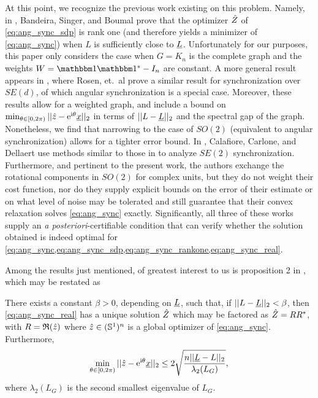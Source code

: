
At this point, we recognize the previous work existing on this problem.  Namely, in \cite{bandeira2016tightness}, Bandeira, Singer, and Boumal prove that the optimizer $\hat{Z}$ of \eqref{eq:ang_sync_sdp} is rank one (and therefore yields a minimizer of \eqref{eq:ang_sync}) when $L$ is sufficiently close to $\underline{L}$.  Unfortunately for our purposes, this paper only considers the case when $G = K_n$ is the complete graph and the weights $W = \one \one^* - I_n$ are constant.  A more general result appears in \cite{bandeira2016se_sync}, where Rosen, et.~al prove a similar result for synchronization over $SE(d)$, of which angular synchronization is a special case.  Moreover, these results allow for a weighted graph, and include a bound on $\min_{\theta \in [0, 2\pi)} ||\hat{z} - \mathrm{e}^{\mathrm{i}\theta} \underline{x}||_2$ in terms of $||L - \underline{L}||_2$ and the spectral gap of the graph.  Nonetheless, we find that narrowing to the case of $SO(2)$ (equivalent to angular synchronization) allows for a tighter error bound.  In \cite{calafiore2016complex_pgo}, Calafiore, Carlone, and Dellaert use methods similar to those in \cite{bandeira2016se_sync} to analyze $SE(2)$ synchronization.  Furthermore, and pertinent to the present work, the authors exchange the rotational components in $SO(2)$ for complex units, but they do not weight their cost function, nor do they supply explicit bounds on the error of their estimate or on what level of noise may be tolerated and still guarantee that their convex relaxation solves \eqref{eq:ang_sync} exactly.  Significantly, all three of these works supply an \emph{a posteriori}-certifiable condition that can verify whether the solution obtained is indeed optimal for \cref{eq:ang_sync,eq:ang_sync_sdp,eq:ang_sync_rankone,eq:ang_sync_real}.

Among the results just mentioned, of greatest interest to us is proposition 2 in \cite{bandeira2016se_sync}, which may be restated as

\begin{proposition}
  There exists a constant $\beta > 0$, depending on $\underline{L}$, such that, if $||L - \underline{L}||_2 < \beta$, then \eqref{eq:ang_sync_real} has a unique solution $\hat{Z}$ which may be factored as $\hat{Z} = R R^*$, with $R = \mathfrak{R}(\hat{z})$ where $\hat{z} \in (\mathbb{S}^1)^n$ is a global optimizer of \eqref{eq:ang_sync}.  Furthermore, \[\min_{\theta \in [0, 2\pi)} ||\hat{z} - \mathrm{e}^{\mathrm{i} \theta} \underline{x}||_2 \le 2 \sqrt{\dfrac{n ||\underline{L} - L||_2}{\lambda_2(L_G)}},\] where $\lambda_2(L_G)$ is the second smallest eigenvalue of $L_G$.
\end{proposition}

